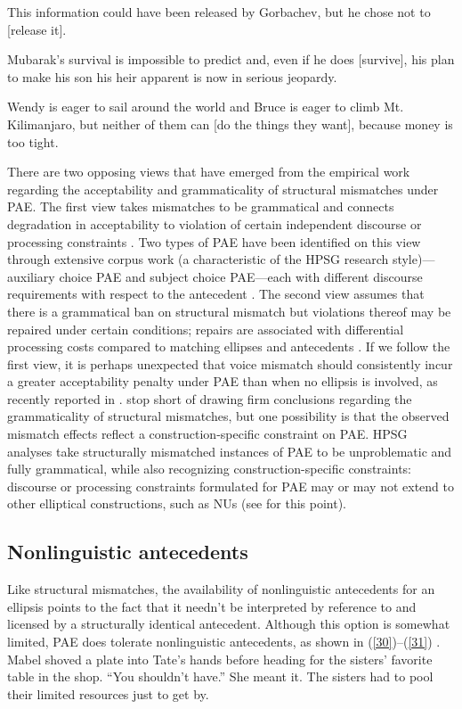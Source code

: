 \documentclass[output=paper
                ,modfonts
                ,nonflat
	        ,collection
	        ,collectionchapter
	        ,collectiontoclongg
 	        ,biblatex
                ,babelshorthands
                ,newtxmath
                ,draftmode
                ,colorlinks, citecolor=brown
]{./langsci/langscibook}
\begin{document}
{\ea This information could have been released by Gorbachev, but he chose not to [release it]. \citep[37]{Hardt1993} \label{27}\z

\ea Mubarak's survival is impossible to predict and, even if he does [survive], his plan to make his son his heir apparent is now in serious jeopardy. \citep{Miller2014a} \label{28}\z

\ea Wendy is eager to sail around the world and Bruce is eager to climb Mt. Kilimanjaro, but neither of them can [do the things they want], because money is too tight. \citep{Webber79a} \label{29}\z

There are two opposing views that have emerged from the empirical work regarding the acceptability and grammaticality of structural mismatches under PAE. The first view takes mismatches to be grammatical and connects degradation in acceptability to violation of certain independent discourse \citep{Kehler2002, Miller2011, %
Miller2014a, Miller2014b} or processing constraints \citep{Kim2011}. Two types of PAE have been identified on this view through extensive corpus work (a characteristic of the HPSG research style)---auxiliary choice PAE and subject choice PAE---each with different discourse requirements with respect to the antecedent \citep{Miller2011, Miller2014a, Miller2014b}. The second view assumes that there is a grammatical ban on structural mismatch but violations thereof may be repaired under certain conditions; repairs are associated with differential processing costs compared to matching ellipses and antecedents \citep{Arregui2006, Grant2012}. If we follow the first view, it is perhaps unexpected that voice mismatch should consistently incur a greater acceptability penalty under PAE than when no ellipsis is involved, as recently reported in \citet{Kim2015}. \citet{Kim2015} stop short of drawing firm conclusions regarding the grammaticality of structural mismatches, but one possibility is that the observed mismatch effects reflect a construction-specific constraint on PAE. HPSG analyses take structurally mismatched instances of PAE to be unproblematic and fully grammatical, while also recognizing construction-specific constraints: discourse or processing constraints formulated for PAE may or may not extend to other elliptical constructions, such as NUs (see \citealt{Ginzburg2018} for this point).


\subsection{Nonlinguistic antecedents}
Like structural mismatches, the availability of nonlinguistic antecedents for an ellipsis points to the fact that it needn't be interpreted by reference to and licensed by a structurally identical antecedent. Although this option is somewhat limited, PAE does tolerate nonlinguistic antecedents, as shown in (\ref{30})--(\ref{31}) \citep[see also][]{Hankamer1976, Schlachter1977}.
\ea Mabel shoved a plate into Tate's hands before heading for the sisters' favorite table in the shop. ``You shouldn't have.'' She meant it. The sisters had to pool their limited resources
just to get by. \citep[ex. 23][]{Miller2014b}\label{30}\z

}
\end{document}
